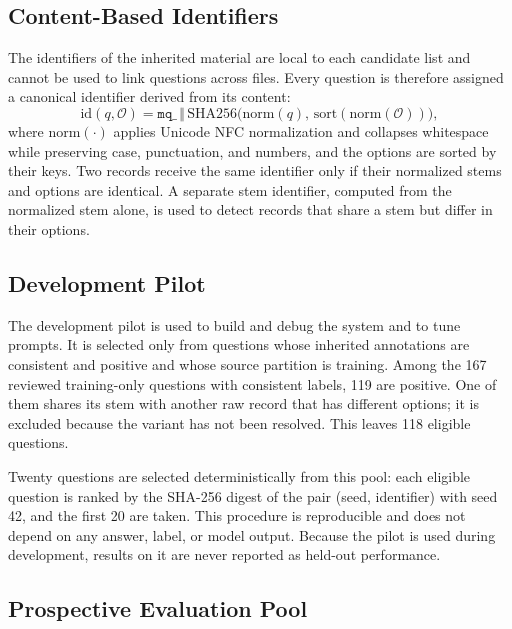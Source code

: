 \subsection{Content-Based Identifiers}

The identifiers of the inherited material are local to each candidate list and cannot be used to link questions across files. Every question is therefore assigned a canonical identifier derived from its content:
\begin{equation}
  \mathrm{id}(q, \mathcal{O}) = \texttt{mq\_} \,\Vert\, \mathrm{SHA256}\big(\mathrm{norm}(q),\, \mathrm{sort}(\mathrm{norm}(\mathcal{O}))\big),
  \label{eq:canonical_id}
\end{equation}
where $\mathrm{norm}(\cdot)$ applies Unicode NFC normalization and collapses whitespace while preserving case, punctuation, and numbers, and the options are sorted by their keys. Two records receive the same identifier only if their normalized stems and options are identical. A separate stem identifier, computed from the normalized stem alone, is used to detect records that share a stem but differ in their options.

\subsection{Development Pilot}

The development pilot is used to build and debug the system and to tune prompts. It is selected only from questions whose inherited annotations are consistent and positive and whose source partition is training. Among the 167 reviewed training-only questions with consistent labels, 119 are positive. One of them shares its stem with another raw record that has different options; it is excluded because the variant has not been resolved. This leaves 118 eligible questions.

Twenty questions are selected deterministically from this pool: each eligible question is ranked by the SHA-256 digest of the pair (seed, identifier) with seed 42, and the first 20 are taken. This procedure is reproducible and does not depend on any answer, label, or model output. Because the pilot is used during development, results on it are never reported as held-out performance.

\subsection{Prospective Evaluation Pool}

